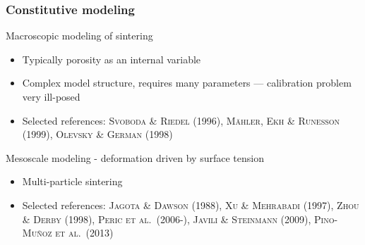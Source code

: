 \documentclass[11pt]{beamer} %
\newcommand{\roughcite}[1]{\textsc{#1}}
\begin{document}
\begin{frame}
 \frametitle{Constitutive modeling}
 Macroscopic modeling of sintering
 \begin{itemize}
  \item Typically porosity as an internal variable
  \item Complex model structure, requires many parameters --- calibration problem very ill-posed
  \item Selected references: \roughcite{Svoboda \& Riedel (1996)}, \roughcite{Mähler, Ekh \& Runesson (1999)}, \roughcite{Olevsky \& German (1998)}
 \end{itemize}

Mesoscale modeling - deformation driven by surface tension
 \begin{itemize}
  \item Multi-particle sintering
  \item Selected references: \roughcite{Jagota \& Dawson (1988)}, \roughcite{Xu \& Mehrabadi (1997)}, \roughcite{Zhou \& Derby (1998)}, \roughcite{Peric et al.\ (2006-)}, \roughcite{Javili \& Steinmann (2009)}, \roughcite{Pino-Muñoz et al.\ (2013)}
 \end{itemize}

\end{frame}

\end{document}
